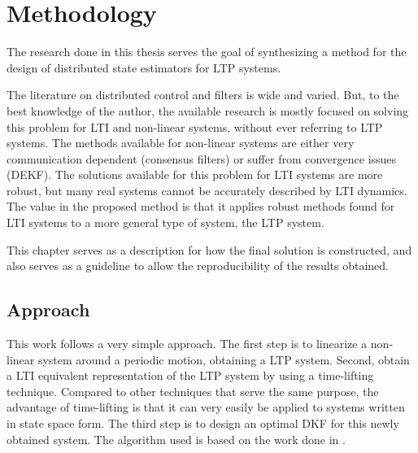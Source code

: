 \chapter{Methodology}
The research done in this thesis serves the goal of synthesizing a method for the design of distributed state estimators for LTP systems.
\par
The literature on distributed control and filters is wide and varied. But, to the best knowledge of the author, the available research is mostly focused on solving this problem for LTI and non-linear systems, without ever referring to LTP systems. The methods available for non-linear systems are either very communication dependent (consensus filters) or suffer from convergence issues (DEKF). The solutions available for this problem for LTI systems are more robust, but many real systems cannot be accurately described by LTI dynamics.
The value in the proposed method is that it applies robust methods found for LTI systems to a more general type of system, the LTP system. 
\par
This chapter serves as a description for how the final solution is constructed, and also serves as a guideline to allow the reproducibility of the results obtained.

\section{Approach}
This work follows a very simple approach. The first step is to linearize a non-linear system around a periodic motion, obtaining a LTP system. Second, obtain a LTI equivalent representation of the LTP system by using a time-lifting technique. Compared to other techniques that serve the same purpose, the advantage of time-lifting is that it can very easily be applied to systems written in state space form. The third step is to design an optimal DKF for this newly obtained system. The algorithm used is based on the work done in \cite{viegas2018discrete}.

